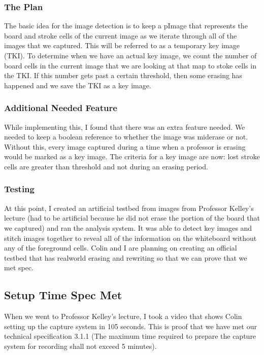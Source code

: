 \documentclass[]{article}
\begin{document}
			\subsubsection{The Plan}
				The basic idea for the image detection is to keep a pImage that represents the board and stroke cells of the current image as we iterate through all of the images that we captured. This will be referred to as a temporary key image (TKI). To determine when we have an actual key image, we count the number of board cells in the current image that we are looking at that map to stoke cells in the TKI. If this number gets past a certain threshold, then some erasing has happened and we save the TKI as a key image.
				
			\subsubsection{Additional Needed Feature}
				While implementing this, I found that there was an extra feature needed. We needed to keep a boolean reference to whether the image was miderase or not. Without this, every image captured during a time when a professor is erasing would be marked as a key image. The criteria for a key image are now: lost stroke cells are greater than threshold and not during an erasing period.
				
			\subsubsection{Testing}
				At this point, I created an artificial testbed from images from Professor Kelley's lecture (had to be artificial because he did not erase the portion of the board that we captured) and ran the analysis system. It was able to detect key images and stitch images together to reveal all of the information on the whiteboard without any of the foreground cells. Colin and I are planning on creating an official testbed that has realworld erasing and rewriting so that we can prove that we met spec.
		
		\subsection{Setup Time Spec Met}
			When we went to Professor Kelley's lecture, I took a video that shows Colin setting up the capture system in 105 seconds. This is proof that we have met our technical specification 3.1.1 (The maximum time required to prepare the capture system for recording shall not exceed 5 minutes).
	
\end{document}
